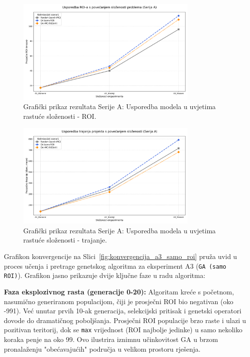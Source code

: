     \begin{figure}[H]
        \centering
        \includegraphics[width=0.8\textwidth]{slike/grafikoni_final/A_skalabilnost_roi.png}
    \caption{Grafički prikaz rezultata Serije A: Usporedba modela u uvjetima rastuće složenosti - ROI.}
    \label{fig:a_skalabilnost_roi}
    \end{figure}
    \begin{figure}[H]
        \centering
        \includegraphics[width=0.8\textwidth]{slike/grafikoni_final/A_skalabilnost_trajanje.png}
    \caption{Grafički prikaz rezultata Serije A: Usporedba modela u uvjetima rastuće složenosti - trajanje.}
    \label{fig:a_skalabilnost_trajanje}
\end{figure}

Grafikon konvergencije na Slici~\ref{fig:konvergencija_a3_samo_roi} pruža uvid u proces učenja i pretrage genetskog algoritma za eksperiment A3 (\texttt{GA (samo ROI)}). Grafikon jasno prikazuje dvije ključne faze u radu algoritma:

\textbf{Faza eksplozivnog rasta (generacije 0-20):} Algoritam kreće s početnom, nasumično generiranom populacijom, čiji je prosječni ROI bio negativan (oko -991). Već unutar prvih 10-ak generacija, selekcijski pritisak i genetski operatori dovode do dramatičnog poboljšanja. Prosječni ROI populacije brzo raste i ulazi u pozitivan teritorij, dok se \texttt{max} vrijednost (ROI najbolje jedinke) u samo nekoliko koraka penje na oko 99. Ovo ilustrira iznimnu učinkovitost GA u brzom pronalaženju "obećavajućih" područja u velikom prostoru rješenja.

